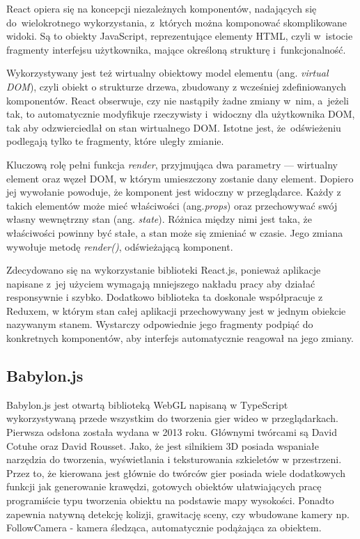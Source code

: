 \documentclass[11pt,a4paper,polish,thesis]{dcsbook}
\begin{document}
	 React opiera się na koncepcji niezależnych komponentów, nadających się do~wielokrotnego wykorzystania, z~których można komponować skomplikowane widoki. Są to obiekty JavaScript, reprezentujące elementy HTML, czyli w~istocie fragmenty interfejsu użytkownika, mające określoną strukturę i~funkcjonalność.
	 
	 Wykorzystywany jest też wirtualny obiektowy model elementu (ang. \textit{virtual DOM}), czyli obiekt o strukturze drzewa, zbudowany z wcześniej zdefiniowanych komponentów. React obserwuje, czy nie nastąpiły żadne zmiany w~nim, a~jeżeli tak, to automatycznie modyfikuje rzeczywisty i~widoczny dla użytkownika DOM, tak aby odzwierciedlał on stan wirtualnego DOM. Istotne jest, że~odświeżeniu podlegają tylko te fragmenty, które uległy zmianie.
	 
	 Kluczową rolę pełni funkcja \textit{render}, przyjmująca dwa parametry --- wirtualny element oraz węzeł DOM, w którym umieszczony zostanie dany element. Dopiero jej wywołanie powoduje, że komponent jest widoczny w przeglądarce. Każdy z takich elementów może mieć właściwości (ang.\textit{props}) oraz przechowywać swój własny wewnętrzny stan (ang. \textit{state}). Różnica między nimi jest taka, że właściwości powinny być stałe, a stan może się zmieniać w czasie. Jego zmiana wywołuje metodę \textit{render()}, odświeżającą komponent.
	
	Zdecydowano się na wykorzystanie biblioteki React.js, ponieważ aplikacje napisane z~jej użyciem wymagają mniejszego nakładu pracy aby działać responsywnie i szybko. Dodatkowo biblioteka ta doskonale współpracuje z Reduxem, w którym stan całej aplikacji przechowywany jest w jednym obiekcie nazywanym stanem. Wystarczy odpowiednie jego fragmenty podpiąć do konkretnych komponentów, aby interfejs automatycznie reagował na jego zmiany. 
		
		
	\subsection{Babylon.js}

	Babylon.js jest otwartą biblioteką WebGL napisaną w TypeScript wykorzystywaną przede wszystkim do tworzenia gier wideo w przeglądarkach. Pierwsza odsłona została wydana w 2013 roku. Głównymi twórcami są David Cotuhe oraz David Rousset. Jako, że jest silnikiem 3D posiada wspaniałe narzędzia do tworzenia, wyświetlania i teksturowania szkieletów w przestrzeni. Przez to, że kierowana jest głównie do twórców gier posiada wiele dodatkowych funkcji jak generowanie krawędzi, gotowych obiektów ułatwiających pracę programiście typu tworzenia obiektu na podstawie mapy wysokości. Ponadto zapewnia natywną detekcję kolizji, grawitację sceny, czy wbudowane kamery np. FollowCamera - kamera śledząca, automatycznie podążająca za obiektem. 
	
\end{document}
